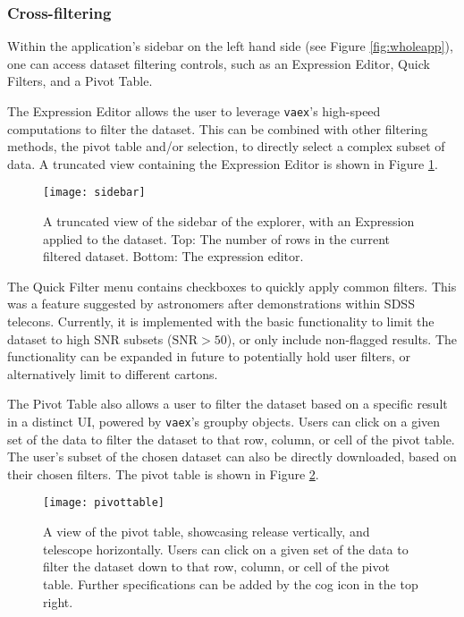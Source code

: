 \documentclass[a4paper,10pt,twocolumn]{article}
\newcommand{\vaex}{\texttt{vaex}}
\begin{document}
\subsubsection{Cross-filtering}
\label{sec:filter}
Within the application's sidebar on the left hand side (see Figure \ref{fig:wholeapp}), one can access dataset filtering controls, such as an Expression Editor, Quick Filters, and a Pivot Table.

The Expression Editor allows the user to leverage \vaex 's high-speed computations to filter the dataset. This can be combined with other filtering methods, the pivot table and/or selection, to directly select a complex subset of data. A truncated view containing the Expression Editor is shown in Figure \ref{fig:sidebar}.

\begin{figure}[tp]
	\centering
	\texttt{[image: sidebar]}
	\caption{A truncated view of the sidebar of the explorer, with an Expression applied to the dataset. Top: The number of rows in the current filtered dataset. Bottom: The expression editor.}
	\label{fig:sidebar}
\end{figure}

The Quick Filter menu contains checkboxes to quickly apply common filters. This was a feature suggested by astronomers after demonstrations within SDSS telecons. Currently, it is implemented with the basic functionality to limit the dataset to high SNR subsets ($\mathrm{SNR} >50$), or only include non-flagged results. The functionality can be expanded in future to potentially hold user filters, or alternatively limit to different cartons.

The Pivot Table also allows a user to filter the dataset based on a specific result in a distinct UI, powered by \vaex's groupby objects. Users can click on a given set of the data to filter the dataset to that row, column, or cell of the pivot table. The user's subset of the chosen dataset can also be directly downloaded, based on their chosen filters. The pivot table is shown in Figure \ref{fig:pivottable}.

\begin{figure}[tp]
	\centering
	\texttt{[image: pivottable]}
	\caption{A view of the pivot table, showcasing release vertically, and telescope horizontally. Users can click on a given set of the data to filter the dataset down to that row, column, or cell of the pivot table. Further specifications can be added by the cog icon in the top right.}
	\label{fig:pivottable}
\end{figure}
\end{document}
